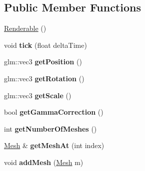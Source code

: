 \subsection*{Public Member Functions}
\begin{DoxyCompactItemize}
\item 
\mbox{\hyperlink{classdarksun_1_1_renderable_a97a0f6efd2a058dfb003e64e63bdb255}{Renderable}} ()
\item 
\mbox{\label{classdarksun_1_1_renderable_a9c4c0507d248cef338904933344c6e24}} 
void {\bfseries tick} (float delta\+Time)
\item 
\mbox{\label{classdarksun_1_1_renderable_ac0cc9596fcd37070d403d0cd225e6771}} 
glm\+::vec3 {\bfseries get\+Position} ()
\item 
\mbox{\label{classdarksun_1_1_renderable_a6ee57b3a597364d311666f49bc7b7e2b}} 
glm\+::vec3 {\bfseries get\+Rotation} ()
\item 
\mbox{\label{classdarksun_1_1_renderable_a83c0c5eb1e45635ff0669310aa270451}} 
glm\+::vec3 {\bfseries get\+Scale} ()
\item 
\mbox{\label{classdarksun_1_1_renderable_ac076b62296056f829803f350e871f74c}} 
bool {\bfseries get\+Gamma\+Correction} ()
\item 
\mbox{\label{classdarksun_1_1_renderable_af098c909ccece05c3168c7886854935b}} 
int {\bfseries get\+Number\+Of\+Meshes} ()
\item 
\mbox{\label{classdarksun_1_1_renderable_a9c93a34399f4e9c22f1e42f2f810a3d6}} 
\mbox{\hyperlink{classdarksun_1_1_mesh}{Mesh}} \& {\bfseries get\+Mesh\+At} (int index)
\item 
\mbox{\label{classdarksun_1_1_renderable_a38bb373ac8cc778bdcfe656d67fbeda2}} 
void {\bfseries add\+Mesh} (\mbox{\hyperlink{classdarksun_1_1_mesh}{Mesh}} m)
\item 
\mbox{\label{classdarksun_1_1_renderable_ab69912a8be432dac2d99b48f54eec2a7}} 

\end{DoxyCompactItemize}

